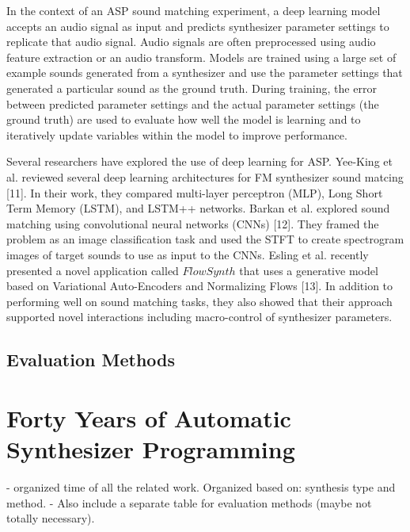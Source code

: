In the context of an ASP sound matching experiment, a deep learning model accepts an audio signal as input and predicts synthesizer parameter settings to replicate that audio signal. Audio signals are often preprocessed using audio feature extraction or an audio transform. Models are trained using a large set of example sounds generated from a synthesizer and use the parameter settings that generated a particular sound as the ground truth. During training, the error between predicted parameter settings and the actual parameter settings (the ground truth) are used to evaluate how well the model is learning and to iteratively update variables within the model to improve performance. 

Several researchers have explored the use of deep learning for ASP. Yee-King et al. reviewed several deep learning architectures for FM synthesizer sound matcing [11]. In their work, they compared multi-layer perceptron (MLP), Long Short Term Memory (LSTM), and LSTM++ networks. Barkan et al. explored sound matching using convolutional neural networks (CNNs) [12]. They framed the problem as an image classification task and used the STFT to create spectrogram images of target sounds to use as input to the CNNs. Esling et al. recently presented a novel application called $FlowSynth$ that uses a generative model based on Variational Auto-Encoders and Normalizing Flows [13]. In addition to performing well on sound matching tasks, they also showed that their approach supported novel interactions including macro-control of synthesizer parameters.

\subsection{Evaluation Methods}
 
\section{Forty Years of Automatic Synthesizer Programming}
- organized time of all the related work. Organized based on: synthesis type and method.
- Also include a separate table for evaluation methods (maybe not totally necessary).

